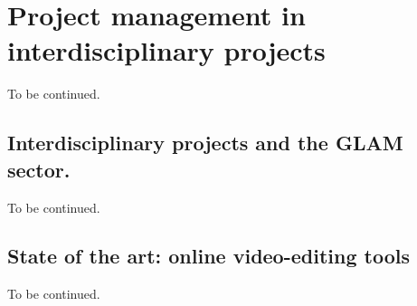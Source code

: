 \chapter{Project management in interdisciplinary projects}
\label{ch:ch2_ProjectManagement}


To be continued. 

\section{Interdisciplinary projects and the GLAM sector.}
\label{sec:GLAM}

To be continued. 

\section{State of the art: online video-editing tools}
\label{sec:stateOfArt}

To be continued. 